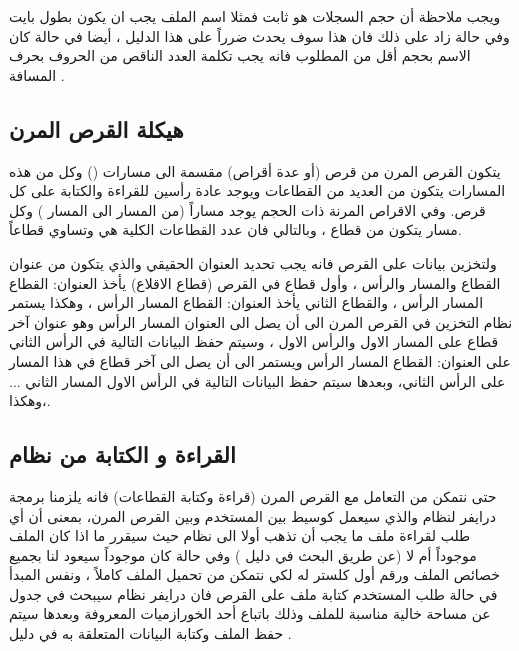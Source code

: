 \documentclass[document.tex]{subfiles}
\begin{document}
ويجب ملاحظة أن حجم السجلات هو ثابت  فمثلا اسم الملف يجب ان يكون بطول  بايت وفي حالة زاد على ذلك فان هذا سوف يحدث ضرراً على هذا الدليل ، أيضا في حالة كان الاسم بحجم أقل من المطلوب فانه يجب تكلمة العدد الناقص من الحروف بحرف المسافة .

\subsection{هيكلة القرص المرن}
يتكون القرص المرن من قرص  (أو عدة أقراص) مقسمة الى مسارات () وكل من هذه المسارات يتكون من العديد من القطاعات ويوجد عادة رأسين للقراءة والكتابة على كل قرص. وفي الاقراص المرنة ذات الحجم  يوجد  مساراً (من المسار  الى المسار ) وكل مسار يتكون من  قطاع ، وبالتالي فان عدد القطاعات الكلية هي  وتساوي  قطاعاً.

ولتخزين بيانات على القرص فانه يجب تحديد العنوان الحقيقي والذي يتكون من عنوان القطاع والمسار والرأس ، وأول قطاع في القرص (قطاع الاقلاع) يأخذ العنوان: القطاع  المسار  الرأس  ، والقطاع الثاني يأخذ العنوان: القطاع  المسار  الرأس  ، وهكذا يستمر نظام التخزين في القرص المرن الى أن يصل الى العنوان  المسار  الرأس  وهو عنوان آخر قطاع على المسار الاول والرأس الاول ، وسيتم حفظ البيانات التالية في الرأس الثاني على العنوان: القطاع  المسار  الرأس  ويستمر الى أن يصل الى آخر قطاع في هذا المسار على الرأس الثاني، وبعدها سيتم حفظ البيانات التالية في الرأس الاول المسار الثاني ... ،وهكذا. %

\subsection{القراءة و الكتابة من نظام  }
حتى نتمكن من التعامل مع القرص المرن (قراءة وكتابة القطاعات) فانه يلزمنا برمجة درايفر  لنظام  والذي سيعمل كوسيط بين المستخدم وبين القرص المرن، بمعنى أن أي طلب لقراءة ملف ما يجب أن تذهب أولا الى نظام  حيث سيقرر ما اذا كان الملف موجوداً أم لا (عن طريق البحث في دليل ) وفي حالة كان موجوداً سيعود لنا بجميع خصائص الملف ورقم أول كلستر له لكي نتمكن من تحميل الملف كاملاً ، ونفس المبدأ في حالة طلب المستخدم كتابة ملف على القرص فان درايفر نظام  سيبحث في جدول  عن مساحة خالية مناسبة للملف وذلك باتباع أحد الخورازميات المعروفة وبعدها سيتم حفظ الملف وكتابة البيانات المتعلقة به في دليل  .
\end{document}
